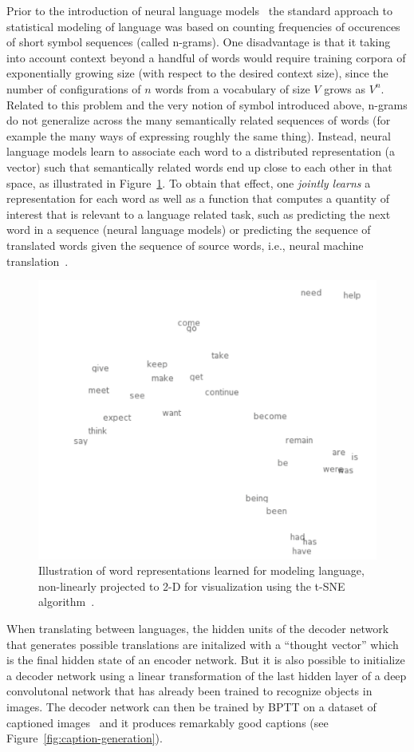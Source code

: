 \documentclass[]{article}
\begin{document}
Prior to the introduction of neural language
models~\citet{BenDucVin01-short} the standard approach to statistical
modeling of language was based on counting frequencies of occurences of
short symbol sequences (called n-grams). One disadvantage is that it
taking into account context beyond a handful of words would require
training corpora of exponentially growing size (with respect to the
desired context size), since the number of configurations of $n$
words from a vocabulary of size $V$ grows as $V^n$. Related to this
problem and the very notion of symbol introduced above, n-grams
do not generalize across the many semantically related sequences 
of words (for example the many ways of expressing roughly the same thing).
Instead, neural language models learn to associate each word to a
distributed representation (a vector) such that semantically related
words end up close to each other in that space, as illustrated in
Figure~\ref{fig:word-embeddings}. To obtain that effect, one
{\em jointly learns} a representation for each word as well as
a function that computes a quantity of interest that is relevant
to a language related task, such as predicting the next word
in a sequence (neural language models) or predicting the sequence
of translated words given the sequence of source words, i.e., neural
machine translation~\citep{Bahdanau-et-al-arxiv2014,Sutskever-et-al-NIPS2014}.


\begin{figure}[H]
\centerline{\includegraphics[width=0.7\linewidth]{word-embeddings.png}}
\caption{Illustration of word representations learned for modeling
language, non-linearly projected to 2-D for visualization using the
t-SNE algorithm~\citep{VanDerMaaten08}.}
\label{fig:word-embeddings}
\end{figure}

When translating between languages, the hidden units of the decoder network
that generates possible translations are initalized with a ``thought
vector'' which is the final hidden state of an encoder network.  But it is
also possible to initialize a decoder network using a linear transformation
of the last hidden layer of a deep convolutonal network that has already
been trained to recognize objects in images. The decoder network can then
be trained by BPTT on a dataset of captioned
images~\cite{NIC,StanfordNIC,more?} and it produces remarkably good
captions (see Figure~\ref{fig:caption-generation}).
\end{document}
